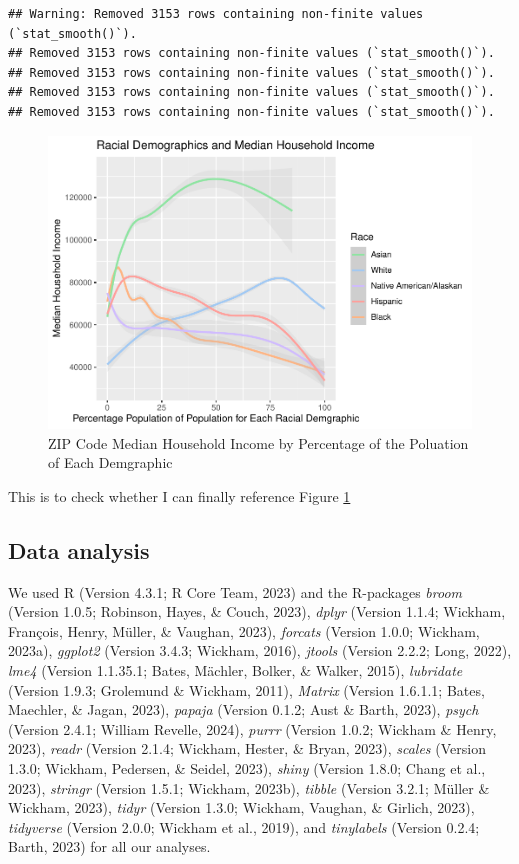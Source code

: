 \documentclass[
  man]{apa6}
\begin{document}
\begin{verbatim}
## Warning: Removed 3153 rows containing non-finite values (`stat_smooth()`).
## Removed 3153 rows containing non-finite values (`stat_smooth()`).
## Removed 3153 rows containing non-finite values (`stat_smooth()`).
## Removed 3153 rows containing non-finite values (`stat_smooth()`).
## Removed 3153 rows containing non-finite values (`stat_smooth()`).
\end{verbatim}

\begin{figure}
\centering
\includegraphics{Richness-Diversity-Markdown_files/figure-latex/race-median-income-fig-1.pdf}
\caption{\label{fig:race-median-income-fig}ZIP Code Median Household Income by Percentage of the Poluation of Each Demgraphic}
\end{figure}

This is to check whether I can finally reference Figure \ref{fig:race-median-income-fig}

\hypertarget{data-analysis}{%
\subsection{Data analysis}\label{data-analysis}}

We used R (Version 4.3.1; R Core Team, 2023) and the R-packages \emph{broom} (Version 1.0.5; Robinson, Hayes, \& Couch, 2023), \emph{dplyr} (Version 1.1.4; Wickham, François, Henry, Müller, \& Vaughan, 2023), \emph{forcats} (Version 1.0.0; Wickham, 2023a), \emph{ggplot2} (Version 3.4.3; Wickham, 2016), \emph{jtools} (Version 2.2.2; Long, 2022), \emph{lme4} (Version 1.1.35.1; Bates, Mächler, Bolker, \& Walker, 2015), \emph{lubridate} (Version 1.9.3; Grolemund \& Wickham, 2011), \emph{Matrix} (Version 1.6.1.1; Bates, Maechler, \& Jagan, 2023), \emph{papaja} (Version 0.1.2; Aust \& Barth, 2023), \emph{psych} (Version 2.4.1; William Revelle, 2024), \emph{purrr} (Version 1.0.2; Wickham \& Henry, 2023), \emph{readr} (Version 2.1.4; Wickham, Hester, \& Bryan, 2023), \emph{scales} (Version 1.3.0; Wickham, Pedersen, \& Seidel, 2023), \emph{shiny} (Version 1.8.0; Chang et al., 2023), \emph{stringr} (Version 1.5.1; Wickham, 2023b), \emph{tibble} (Version 3.2.1; Müller \& Wickham, 2023), \emph{tidyr} (Version 1.3.0; Wickham, Vaughan, \& Girlich, 2023), \emph{tidyverse} (Version 2.0.0; Wickham et al., 2019), and \emph{tinylabels} (Version 0.2.4; Barth, 2023) for all our analyses.
\end{document}
